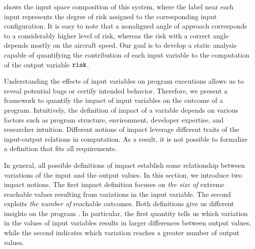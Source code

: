  shows the input space composition of this system, where the label near each input represents the degree of risk assigned to the corresponding input configuration.
It is easy to note that a nonaligned angle of approach corresponds to a considerably higher level of risk, whereas the risk with a correct angle depends mostly on the aircraft speed.
Our goal is to develop a static analysis capable of quantifying the contribution of each input variable to the computation of the output variable $\texttt{risk}{}$.


\newcommand{\exampleinput}[1][\defaultprogramexampleletter]{\textsc{Input}_{#1}}

Understanding the effects of input variables on program executions allows us to reveal potential bugs or certify intended behavior.
Therefore, we present a framework to quantify the impact of input variables on the outcome of a program.
Intuitively, the definition of impact of a variable depends on various factors such as program structure, environment, developer expertise, and researcher intuition.
Different notions of impact leverage different traits of the input-output relations in computation.
As a result, it is not possible to formalize a definition that fits all requirements.

In general, all possible definitions of impact establish some relationship between variations of the input and the output values.
In this section, we introduce two impact notions.
The first impact definition focuses on \textit{the size of} extreme reachable values resulting from variations in the input variable.
The second exploits \textit{the number of} reachable outcomes.
Both definitions give us different insights on the program \landingprogram.
In particular, the first quantity tells us which variation in the values of input variables results in larger differences between output values, while the second indicates which variation reaches a greater number of output values.

